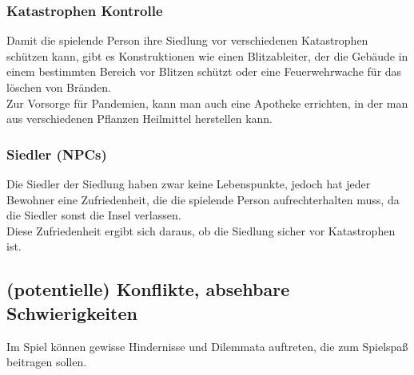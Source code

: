\documentclass[paper=A4,pagesize=auto,12pt,headinclude=true,footinclude=true,BCOR=0mm,DIV=calc]{scrartcl}
\newcommand{\sectionspace}{
	\vspace{0.5cm}
}
\begin{document}
\subsubsection{Katastrophen Kontrolle}
Damit die spielende Person ihre Siedlung vor verschiedenen Katastrophen schützen kann, gibt es Konstruktionen wie einen Blitzableiter, der die Gebäude in einem bestimmten Bereich vor Blitzen schützt oder eine Feuerwehrwache für das löschen von Bränden.\\
Zur Vorsorge für Pandemien, kann man auch eine Apotheke errichten, in der man aus verschiedenen Pflanzen Heilmittel herstellen kann. 

\subsubsection{Siedler (NPCs)}
Die Siedler der Siedlung haben zwar keine Lebenspunkte, jedoch hat jeder Bewohner eine Zufriedenheit, die die spielende Person aufrechterhalten muss, da die Siedler sonst die Insel verlassen.\\
Diese Zufriedenheit ergibt sich daraus, ob die Siedlung sicher vor Katastrophen ist.

\sectionspace
\subsection{(potentielle) Konflikte, absehbare Schwierigkeiten}\label{sec:Konflikte}

Im Spiel können gewisse Hindernisse und Dilemmata auftreten, die zum Spielspaß beitragen sollen.\\
\end{document}
